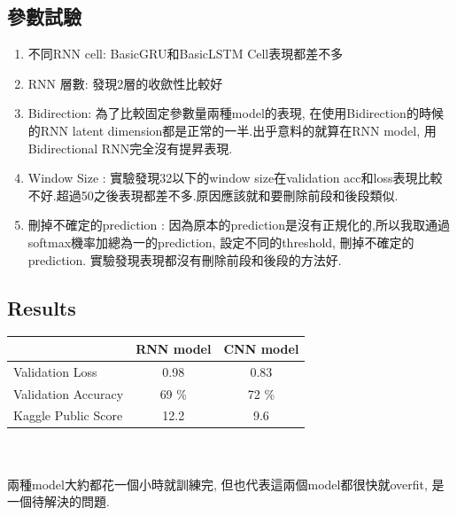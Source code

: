 \documentclass[12pt, a4paper]{article}
\begin{document}
		\subsection{參數試驗}
			\begin{enumerate}
				\item 不同RNN cell: BasicGRU和BasicLSTM Cell表現都差不多
				\item RNN 層數: 發現2層的收歛性比較好
				\item Bidirection: 
				為了比較固定參數量兩種model的表現, 在使用Bidirection的時候的RNN latent dimension都是正常的一半.出乎意料的就算在RNN model, 用Bidirectional RNN完全沒有提昇表現.
				\item Window Size :
				實驗發現32以下的window size在validation acc和loss表現比較不好.超過50之後表現都差不多.原因應該就和要刪除前段和後段類似.
				\item 刪掉不確定的prediction :
				因為原本的prediction是沒有正規化的,所以我取通過softmax機率加總為一的prediction, 設定不同的threshold, 刪掉不確定的prediction. 實驗發現表現都沒有刪除前段和後段的方法好.
			\end{enumerate}
		\subsection{Results}
			\begin{tabular}{|l|c|c|}
				\hline
									& RNN model & CNN model \\\hline
				Validation Loss		& 0.98 		& 0.83 		\\\hline 
				Validation Accuracy	& 69 \% 	& 72 \% 	\\\hline
				Kaggle Public Score & 12.2 		& 9.6 		\\\hline
			\end{tabular}\\\\
			兩種model大約都花一個小時就訓練完, 但也代表這兩個model都很快就overfit, 是一個待解決的問題.
		
		
\end{document}
